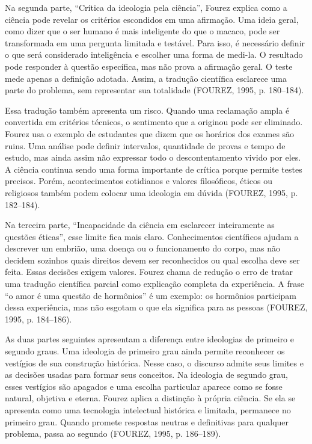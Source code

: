 \documentclass[12pt,a4paper]{article}
\begin{document}
Na segunda parte, ``Crítica da ideologia pela ciência'', Fourez explica como a ciência pode revelar os critérios escondidos em uma afirmação. Uma ideia geral, como dizer que o ser humano é mais inteligente do que o macaco, pode ser transformada em uma pergunta limitada e testável. Para isso, é necessário definir o que será considerado inteligência e escolher uma forma de medi-la. O resultado pode responder à questão específica, mas não prova a afirmação geral. O teste mede apenas a definição adotada. Assim, a tradução científica esclarece uma parte do problema, sem representar sua totalidade (FOUREZ, 1995, p. 180--184).

Essa tradução também apresenta um risco. Quando uma reclamação ampla é convertida em critérios técnicos, o sentimento que a originou pode ser eliminado. Fourez usa o exemplo de estudantes que dizem que os horários dos exames são ruins. Uma análise pode definir intervalos, quantidade de provas e tempo de estudo, mas ainda assim não expressar todo o descontentamento vivido por eles. A ciência continua sendo uma forma importante de crítica porque permite testes precisos. Porém, acontecimentos cotidianos e valores filosóficos, éticos ou religiosos também podem colocar uma ideologia em dúvida (FOUREZ, 1995, p. 182--184).

Na terceira parte, ``Incapacidade da ciência em esclarecer inteiramente as questões éticas'', esse limite fica mais claro. Conhecimentos científicos ajudam a descrever um embrião, uma doença ou o funcionamento do corpo, mas não decidem sozinhos quais direitos devem ser reconhecidos ou qual escolha deve ser feita. Essas decisões exigem valores. Fourez chama de redução o erro de tratar uma tradução científica parcial como explicação completa da experiência. A frase ``o amor é uma questão de hormônios'' é um exemplo: os hormônios participam dessa experiência, mas não esgotam o que ela significa para as pessoas (FOUREZ, 1995, p. 184--186).

As duas partes seguintes apresentam a diferença entre ideologias de primeiro e segundo graus. Uma ideologia de primeiro grau ainda permite reconhecer os vestígios de sua construção histórica. Nesse caso, o discurso admite seus limites e as decisões usadas para formar seus conceitos. Na ideologia de segundo grau, esses vestígios são apagados e uma escolha particular aparece como se fosse natural, objetiva e eterna. Fourez aplica a distinção à própria ciência. Se ela se apresenta como uma tecnologia intelectual histórica e limitada, permanece no primeiro grau. Quando promete respostas neutras e definitivas para qualquer problema, passa ao segundo (FOUREZ, 1995, p. 186--189).
\end{document}
